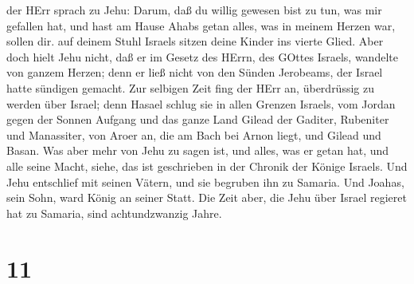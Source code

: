 der HErr sprach zu Jehu: Darum, daß du willig gewesen bist zu tun, was
mir gefallen hat, und hast am Hause Ahabs getan alles, was in meinem
Herzen war, sollen dir. auf deinem Stuhl Israels sitzen deine Kinder ins
vierte Glied.  Aber doch hielt Jehu nicht, daß er im Gesetz
des HErrn, des GOttes Israels, wandelte von ganzem Herzen; denn er ließ
nicht von den Sünden Jerobeams, der Israel hatte sündigen gemacht.
 Zur selbigen Zeit fing der HErr an, überdrüssig zu werden
über Israel; denn Hasael schlug sie in allen Grenzen Israels,
 vom Jordan gegen der Sonnen Aufgang und das ganze Land
Gilead der Gaditer, Rubeniter und Manassiter, von Aroer an, die am Bach
bei Arnon liegt, und Gilead und Basan.  Was aber mehr von
Jehu zu sagen ist, und alles, was er getan hat, und alle seine Macht,
siehe, das ist geschrieben in der Chronik der Könige Israels.
 Und Jehu entschlief mit seinen Vätern, und sie begruben
ihn zu Samaria. Und Joahas, sein Sohn, ward König an seiner Statt.
 Die Zeit aber, die Jehu über Israel regieret hat zu
Samaria, sind achtundzwanzig Jahre.

\hypertarget{section-10}{%
\section{11}\label{section-10}}

